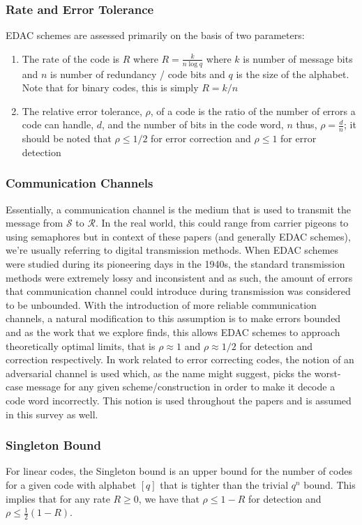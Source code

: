 \documentclass[12pt]{article}%
\newcommand{\Sen}{\mathcal{S}}
\newcommand{\Rec}{\mathcal{R}}
\begin{document}
\subsubsection{Rate and Error Tolerance}

 EDAC schemes are assessed primarily on the basis of two parameters: \begin{enumerate}
    \item The rate of the code is $R$ where $R = \frac{k}{n \log q}$ where $k$ is number of message bits and $n$ is number of redundancy / code bits and $q$ is the size of the alphabet. Note that for binary codes, this is simply $R = k/n$ 
    \item The relative error tolerance, $\rho$, of a code is the ratio of the number of errors a code can handle, $d$, and the number of bits in the code word, $n$ thus, $\rho = \frac{d}{n}$; it should be noted that $\rho \leq 1/2$ for error correction and $\rho \leq 1$ for error detection 
\end{enumerate}

\subsubsection{Communication Channels}

Essentially, a communication channel is the medium that is used to transmit the message from $\Sen$ to $\Rec$. In the real world, this could range from carrier pigeons to using semaphores but in context of these papers (and generally EDAC schemes), we're usually referring to digital transmission methods. When EDAC schemes were studied during its pioneering days in the 1940s, the standard transmission methods were extremely lossy and inconsistent and as such, the amount of errors that communication channel could introduce during transmission was considered to be unbounded. With the introduction of more reliable communication channels, a natural modification to this assumption is to make errors bounded and as the work that we explore finds, this allows EDAC schemes to approach theoretically optimal limits, that is $\rho \approx1$ and $\rho \approx 1/2$ for detection and correction respectively. In work related to error correcting codes, the notion of an adversarial channel is used which, as the name might suggest, picks the worst-case message for any given scheme/construction in order to make it decode a code word incorrectly. This notion is used throughout the papers and is assumed in this survey as well. 

\subsubsection{Singleton Bound}
For linear codes, the Singleton bound is an upper bound for the number of codes for a given code with alphabet $[q]$ that is tighter than the trivial $q^n$ bound. This implies that for any rate $R \geq 0$, we have that $\rho \leq 1 - R$ for detection and $\rho \leq \frac{1}{2}(1 - R)$. 
 
\end{document}
